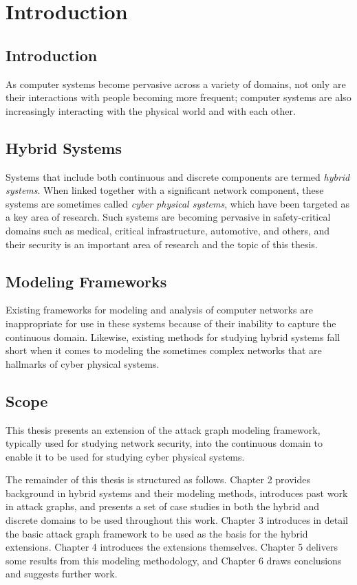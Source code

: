 \chapter{Introduction}
\section{Introduction}
As computer systems become pervasive across a variety of domains, not only are their interactions
with people becoming more frequent; computer systems are also increasingly interacting with the 
physical world and with each other.
\section{Hybrid Systems}
Systems that include both continuous and discrete components are termed \emph{hybrid systems}.
When linked together with a significant network component, these systems are sometimes called
\emph{cyber physical systems}, which have been targeted as a key area of research. Such systems
are becoming pervasive in safety-critical domains such as medical, critical infrastructure, 
automotive, and others, and their security is an important area of research and the topic of this
thesis.
\section{Modeling Frameworks}
Existing frameworks for modeling and analysis of computer networks are inappropriate for use in
these systems because of their inability to capture the continuous domain. Likewise, existing
methods for studying hybrid systems fall short when it comes to modeling the sometimes complex
networks that are hallmarks of cyber physical systems.

\section{Scope}
This thesis presents an extension of the attack graph modeling framework, typically used for studying
network security, into the continuous domain to enable it to be used for studying cyber
physical systems.

The remainder of this thesis is structured as follows. Chapter 2 provides background in hybrid systems
and their modeling methods, introduces past work in attack graphs, and presents a set of case studies
in both the hybrid and discrete domains to be used throughout this work. Chapter 3 introduces in detail
the basic attack graph framework to be used as the basis for the hybrid extensions. Chapter 4
introduces the extensions themselves. Chapter 5 delivers some results from this modeling methodology,
and Chapter 6 draws conclusions and suggests further work.